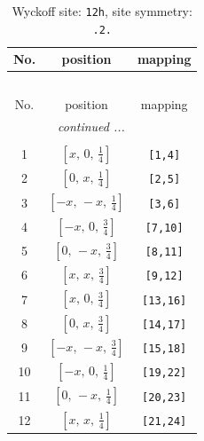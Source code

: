 \documentclass[fleqn,8pt]{jsarticle}
\begin{document}
\begin{longtable}{ccc}
\caption{Wyckoff site: {\tt 12h}, site symmetry: {\tt .2.}}
 \\
 \hline \hline
No. & position & mapping \\ \hline \endfirsthead

\multicolumn{2}{l}{\tablename\ \thetable{}} \\
 \hline \hline
No. & position & mapping \\ \hline \endhead

 \hline \hline
\multicolumn{2}{r}{\footnotesize\it continued ...} \\ \endfoot

 \hline \hline
\multicolumn{2}{r}{} \\ \endlastfoot

1 & $\left[ x,\, 0,\, \frac{1}{4} \right]$ & {\tt [1,4]} \\ \hline
2 & $\left[ 0,\, x,\, \frac{1}{4} \right]$ & {\tt [2,5]} \\ \hline
3 & $\left[ - x,\, - x,\, \frac{1}{4} \right]$ & {\tt [3,6]} \\ \hline
4 & $\left[ - x,\, 0,\, \frac{3}{4} \right]$ & {\tt [7,10]} \\ \hline
5 & $\left[ 0,\, - x,\, \frac{3}{4} \right]$ & {\tt [8,11]} \\ \hline
6 & $\left[ x,\, x,\, \frac{3}{4} \right]$ & {\tt [9,12]} \\ \hline
7 & $\left[ x,\, 0,\, \frac{3}{4} \right]$ & {\tt [13,16]} \\ \hline
8 & $\left[ 0,\, x,\, \frac{3}{4} \right]$ & {\tt [14,17]} \\ \hline
9 & $\left[ - x,\, - x,\, \frac{3}{4} \right]$ & {\tt [15,18]} \\ \hline
10 & $\left[ - x,\, 0,\, \frac{1}{4} \right]$ & {\tt [19,22]} \\ \hline
11 & $\left[ 0,\, - x,\, \frac{1}{4} \right]$ & {\tt [20,23]} \\ \hline
12 & $\left[ x,\, x,\, \frac{1}{4} \right]$ & {\tt [21,24]} \\
\end{longtable}
\renewcommand{\arraystretch}{1.2}
\end{document}
